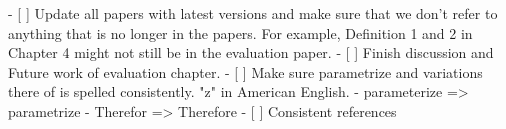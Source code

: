   - [ ] Update all papers with latest versions and make sure that we don't refer to anything that is no longer in the papers. For example, Definition 1 and 2 in Chapter 4 might not still be in the evaluation paper.
  - [ ] Finish discussion and Future work of evaluation chapter.
  - [ ] Make sure parametrize and variations there of is spelled consistently. "z" in American English.
        - parameterize => parametrize
        - Therefor => Therefore
  - [ ] Consistent references
  